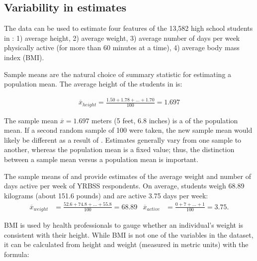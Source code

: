 \begin{spacing}{1.5}
\section[Variability in estimates]{Variability in estimates} %
\label{variabilityInEstimates}


The  data can be used to estimate four features of the 13,582 high school students in : 1) average height, 2) average weight, 3) average number of days per week physically active (for more than 60 minutes at a time), 4) average body mass index (BMI).

Sample means are the natural choice of summary statistic for estimating a population mean. The average height of the students in  is:

\begin{align*}
\overline{x}_{height} = \frac{1.50 + 1.78 + \dots + 1.70}{100} = 1.697
\end{align*}

The sample mean $\overline{x} = 1.697$ meters (5 feet, 6.8 inches) is a  of the population mean. If a second random sample of 100 were taken, the new sample mean would likely be different as a result of .  Estimates generally vary from one sample to another, whereas the population mean is a fixed value; thus, the distinction between a sample mean versus a population mean is important. 

The sample means of  and  provide estimates of the average weight and number of days active per week of YRBSS respondents. On average, students weigh 68.89 kilograms (about 151.6 pounds) and are active 3.75 days per week:
\begin{align*}
\overline{x}_{weight} &= \frac{52.6 + 74.8 + \dots + 55.8}{100} = 68.89
&\overline{x}_{active} &= \frac{0 + 7 + \dots + 1}{100} = 3.75.
\end{align*}

BMI is used by health professionals to gauge whether an individual's weight is consistent with their height. While BMI is not one of the variables in the dataset, it can be calculated from height and weight (measured in metric units) with the formula:


\end{spacing}
